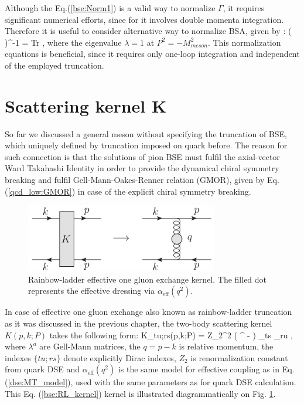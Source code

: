 Although the Eq.(\ref{bse:Norm1}) is a valid way to normalize $\Gamma$, it requires significant numerical efforts, since for it involves double momenta integration. Therefore it is useful to consider alternative way to normalize BSA, given by \cite{PhysRev.138.B1182,PhysRev.139.AB1,Fischer:2009jm}:
\beqa
	\Bigl(  \Bigl)^{-1} = \int {} Tr \;,
	\label{bse:Norm2}
\eeqa
where the eigenvalue $\lambda=1$ at $P^2=-M^2_{meson}$. This normalization equations is beneficial, since it requires only one-loop integration and independent of the employed truncation.

\section{Scattering kernel K}
So far we discussed a general meson \BSE without specifying the truncation of BSE, which uniquely defined by truncation imposed on quark \DSE before. The reason for such connection is that the solutions of pion BSE must fulfil the axial-vector Ward Takahashi Identity in order to provide the dynamical chiral symmetry breaking and fulfil Gell-Mann-Oakes-Renner relation (GMOR), given by Eq.(\ref{qcd_low:GMOR}) in case of the explicit chiral symmetry breaking. \\
\begin{figure}[H]
\tiny
 \begin{center}
  \includegraphics[width=0.75\textwidth]{figures/RL_kernel}
 \end{center}
 \caption{\footnotesize Rainbow-ladder effective one gluon exchange kernel. The filled dot represents the effective dressing via $\alpha_{\mathrm{eff}}(q^2)$. }\label{fig:RL_kernel} 
\end{figure}
In case of effective one gluon exchange also known as rainbow-ladder truncation as it was discussed in the previous chapter, the two-body scattering kernel $K(p,k;P)$ takes the following form:
\beqa
	K_{tu;rs}(p,k;P) = Z_2^2 \Bigl( \delta^{\mu\nu} -  \Bigl)  
	_{ts} 
	_{ru} \;,
	\label{bse:RL_kernel}
\eeqa
where $\lambda^a$ are Gell-Mann matrices, the $q=p-k$ is relative momentum, the indexes $\{tu;rs\}$ denote explicitly Dirac indexes, $Z_2$ is renormalization constant from quark DSE and $\alpha_{\mathrm{eff}}(q^2)$ is the same model for effective coupling as in Eq.(\ref{dse:MT_model}), used with the same parameters as for quark DSE calculation. This Eq. (\ref{bse:RL_kernel}) kernel is illustrated diagrammatically on Fig. \ref{fig:RL_kernel}. \\

